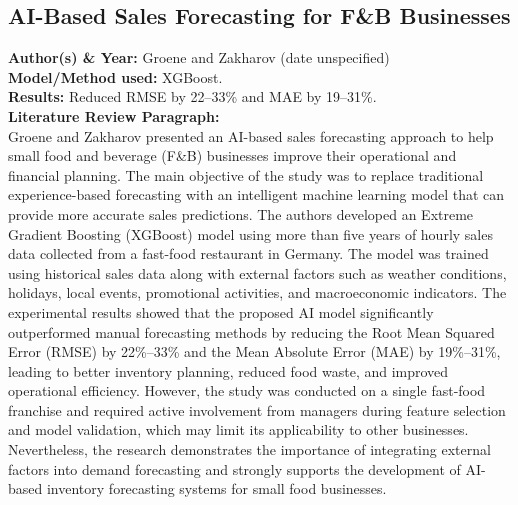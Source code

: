 \documentclass[conference]{IEEEtran}
\begin{document}
\subsection{AI-Based Sales Forecasting for F\&B Businesses}
\textbf{Author(s) \& Year:} Groene and Zakharov (date unspecified)\\
\textbf{Model/Method used:} XGBoost.\\
\textbf{Results:} Reduced RMSE by 22--33\% and MAE by 19--31\%.\\
\textbf{Literature Review Paragraph:}\\
Groene and Zakharov presented an AI-based sales forecasting approach to help small food and beverage (F\&B) businesses improve their operational and financial planning. The main objective of the study was to replace traditional experience-based forecasting with an intelligent machine learning model that can provide more accurate sales predictions. The authors developed an Extreme Gradient Boosting (XGBoost) model using more than five years of hourly sales data collected from a fast-food restaurant in Germany. The model was trained using historical sales data along with external factors such as weather conditions, holidays, local events, promotional activities, and macroeconomic indicators. The experimental results showed that the proposed AI model significantly outperformed manual forecasting methods by reducing the Root Mean Squared Error (RMSE) by 22\%--33\% and the Mean Absolute Error (MAE) by 19\%--31\%, leading to better inventory planning, reduced food waste, and improved operational efficiency. However, the study was conducted on a single fast-food franchise and required active involvement from managers during feature selection and model validation, which may limit its applicability to other businesses. Nevertheless, the research demonstrates the importance of integrating external factors into demand forecasting and strongly supports the development of AI-based inventory forecasting systems for small food businesses.
\end{document}
